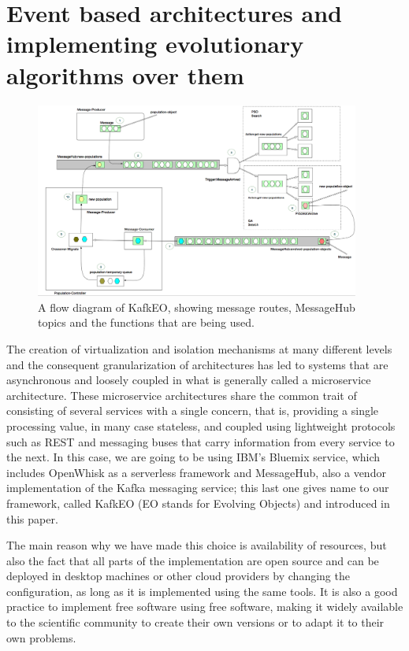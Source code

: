 \documentclass[sigconf]{acmart}
\begin{document}
\section{Event based architectures and implementing evolutionary
  algorithms over them}
\label{sec:methods}
%
\begin{figure}[h!tbp]
\includegraphics[width=0.95\textwidth]{img/kafkEO.png}
\caption{A flow diagram of KafkEO, showing message routes, MessageHub
  topics and the functions that are being used.}
\label{fig:kafkeo2}
\end{figure}
%
The creation of virtualization and isolation mechanisms at many
different levels and the consequent granularization of architectures
has led to systems that are asynchronous and loosely coupled in what
is generally called a microservice architecture. These microservice
architectures share the common trait of consisting of several services
with a single concern, that is, providing a single processing value,
in many case stateless, and coupled using lightweight protocols such
as REST and messaging buses that carry information from every service
to the next. In this case, we are going to be using IBM's Bluemix
service, which includes OpenWhisk as a serverless framework and
MessageHub, also a vendor implementation of the Kafka messaging
service; this last one gives name to our framework, called KafkEO (EO
stands for Evolving Objects) and introduced in this paper.

The main reason why we have made this choice is availability of
resources, but also
the fact that all parts of the implementation are open source and can
be deployed in desktop machines or other cloud providers by changing
the configuration, as long as it is implemented using the same tools. It is also a good practice to implement free
software using free software, making it widely available to the
scientific community to create their own versions or to adapt it to
their own problems.
\end{document}

